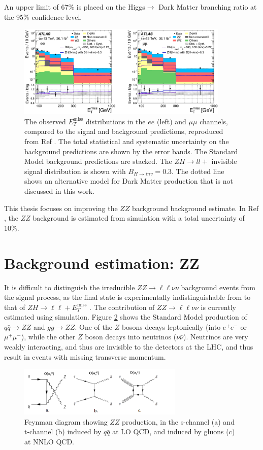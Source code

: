 \documentclass[12pt,a4paper,openright,twoside]{report}
\newcommand{\ZZ}{$ZZ\to \ell\ell\nu\nu$ }
\newcommand{\met}{$E_T^{\mathrm{miss}}$ }
\begin{document}
An upper limit of 67\% is placed on the Higgs$\to$ Dark Matter branching ratio at the 95\% confidence level.
\begin{figure}[h]
\centering
		\includegraphics[width=0.9\textwidth]{ZH_results.png}
		\caption{The observed \met distributions in the $ee$ (left) and $\mu\mu$ channels, compared to the signal and background predictions, reproduced from Ref \cite{ZH_ATLAS}. The total statistical and systematic uncertainty on the background predictions are shown by the error bands. The Standard Model background predictions are stacked. The $ZH\to ll+$ invisible signal distribution is shown with $B_{H\to inv}=0.3$. The dotted line shows an alternative model for Dark Matter production that is not discussed in this work.}
		\label{fig:ZH_results}
\end{figure}

This thesis focuses on improving the $ZZ$ background background estimate. In Ref \cite{ZH_ATLAS}, the $ZZ$ background is estimated from simulation with a total uncertainty of 10\%.



\section{Background estimation: ZZ}
It is difficult to distinguish the irreducible \ZZ background events from the signal process, as the final state is experimentally indistinguishable from to that of $ZH\to \ell\ell+$\met. The contribution of \ZZ is currently estimated using simulation. Figure \ref{fig:ZZ} shows the Standard Model production of $q\bar{q}\to ZZ$ and $gg\to ZZ$. One of the $Z$ bosons decays leptonically (into $e^+e^-$ or $\mu^+\mu^-$), while the other $Z$ boson decays into neutrinos ($\nu\bar{\nu}$). Neutrinos are very weakly interacting, and thus are invisible to the detectors at the LHC, and thus result in events with missing transverse momentum.

\begin{figure}[H]
\centering
		\includegraphics[width=0.7\textwidth]{ZZ.png}
		\caption{Feynman diagram showing $ZZ$ production, in the s-channel (a) and t-channel (b) induced by $q\bar{q}$ at LO QCD, and induced by gluons (c) at NNLO QCD.}
		\label{fig:ZZ}
\end{figure}
\end{document}
